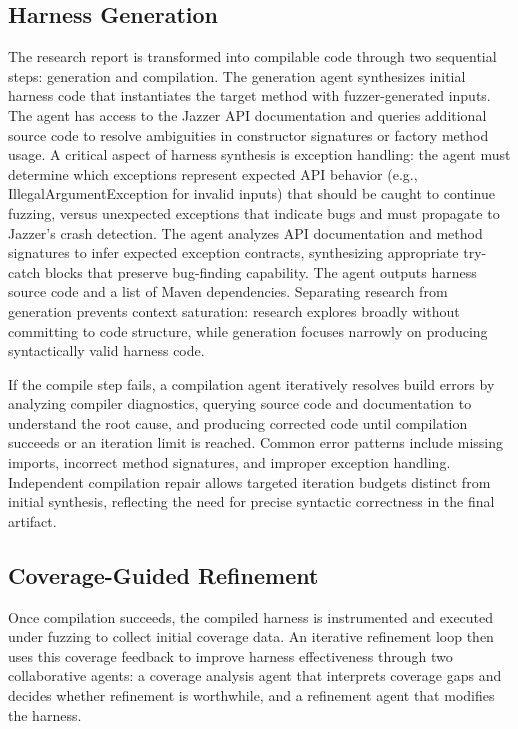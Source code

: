\subsection{Harness Generation}%
\label{subsec:harness-generation}

The research report is transformed into compilable code through two sequential steps: generation and compilation. The generation agent synthesizes initial harness code that instantiates the target method with fuzzer-generated inputs. The agent has access to the Jazzer API documentation and queries additional source code to resolve ambiguities in constructor signatures or factory method usage. A critical aspect of harness synthesis is exception handling: the agent must determine which exceptions represent expected API behavior (e.g., IllegalArgumentException for invalid inputs) that should be caught to continue fuzzing, versus unexpected exceptions that indicate bugs and must propagate to Jazzer's crash detection. The agent analyzes API documentation and method signatures to infer expected exception contracts, synthesizing appropriate try-catch blocks that preserve bug-finding capability. The agent outputs harness source code and a list of Maven dependencies. Separating research from generation prevents context saturation: research explores broadly without committing to code structure, while generation focuses narrowly on producing syntactically valid harness code.

If the compile step fails, a compilation agent iteratively resolves build errors by analyzing compiler diagnostics, querying source code and documentation to understand the root cause, and producing corrected code until compilation succeeds or an iteration limit is reached. Common error patterns include missing imports, incorrect method signatures, and improper exception handling. Independent compilation repair allows targeted iteration budgets distinct from initial synthesis, reflecting the need for precise syntactic correctness in the final artifact.
\subsection{Coverage-Guided Refinement}%
\label{subsec:coverage-guided-refinement}


Once compilation succeeds, the compiled harness is instrumented and executed under fuzzing to collect initial coverage data. An iterative refinement loop then uses this coverage feedback to improve harness effectiveness through two collaborative agents: a coverage analysis agent that interprets coverage gaps and decides whether refinement is worthwhile, and a refinement agent that modifies the harness.

